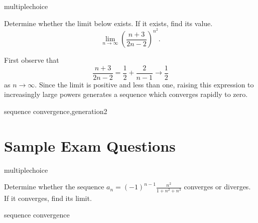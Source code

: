 \documentclass{ximera}
\begin{document}
\begin{question}[SeqConvEXPN39]
\begin{type}
multiplechoice
\end{type}
Determine whether the limit below exists. If it exists, find its value.
\[\lim_{n \rightarrow \infty} \left(\frac{n + 3}{2n - 2}\right)^{n^2}.\] 
\begin{multiplechoice}
\end{multiplechoice}
\begin{feedback}
First observe that 
\[\frac{n + 3}{2n - 2} = \frac{1}{2} + \frac{2}{n - 1} \rightarrow \frac{1}{2}\]
as \(n \rightarrow \infty\). Since the limit is positive and less than one, raising this expression to increasingly large powers generates a sequence which converges rapidly to zero.
\end{feedback}
\begin{keywords}
sequence convergence,generation2
\end{keywords}
\end{question}

\section*{Sample Exam Questions}

\begin{question}[2016C.08]
\begin{type}
multiplechoice
\end{type}
Determine whether the sequence \(\displaystyle a_n = (-1)^{n-1} \frac{n^2}{1 + n^2 + n^3}\) converges or diverges. If it converges, find its limit.
\begin{multiplechoice}
\end{multiplechoice}
\begin{keywords}
sequence convergence
\end{keywords}
\end{question}
\end{document}
